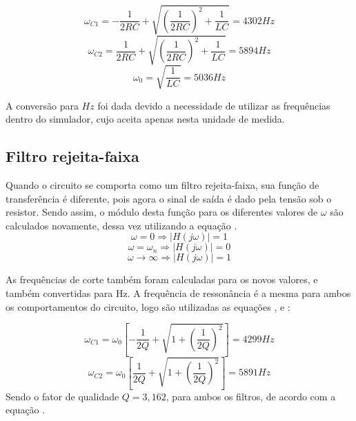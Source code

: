 \begin{equation}
	\omega_{C1}= -\frac{1}{2RC}+\sqrt{(\frac{1}{2RC})^2+\frac{1}{LC}}= 4302 Hz
\end{equation}
\begin{equation}
	\omega_{C2}=\frac{1}{2RC}+\sqrt{(\frac{1}{2RC})^2+\frac{1}{LC}}= 5894 Hz
\end{equation}
\begin{equation}
	\omega_0=\sqrt{\frac{1}{LC}}= 5036 Hz
\end{equation}

A conversão para $Hz$ foi dada devido a necessidade de utilizar as frequências dentro do simulador, cujo aceita apenas nesta unidade de medida.

\subsection{Filtro rejeita-faixa}
Quando o circuito se comporta como um filtro rejeita-faixa, sua função de transferência é diferente, pois agora o sinal de saída é dado pela tensão sob o resistor. Sendo assim, o módulo desta função para os diferentes valores de $\omega$ são calculados novamente, dessa vez utilizando a equação .
\begin{equation}
	\omega=0 \Rightarrow |H(j\omega)|= 1
\end{equation}
\begin{equation}
	\omega=\omega_n \Rightarrow |H(j\omega)|= 0
\end{equation}
\begin{equation}
	\omega\rightarrow\infty \Rightarrow |H(j\omega)|= 1
\end{equation}

As frequências de corte também foram calculadas para os novos valores, e também convertidas para Hz. A frequência de ressonância é a mesma para ambos os comportamentos do circuito, logo são utilizadas as equações ,  e :

\begin{equation}
	\omega_{C1}=\omega_0[-\frac{1}{2Q}+\sqrt{1+(\frac{1}{2Q})^2}]= 4299 Hz
\end{equation}
\begin{equation}
	\omega_{C2}=\omega_0[\frac{1}{2Q}+\sqrt{1+(\frac{1}{2Q})^2}]= 5891 Hz
\end{equation}
Sendo o fator de qualidade $Q= 3,162$, para ambos os filtros, de acordo com a equação .

